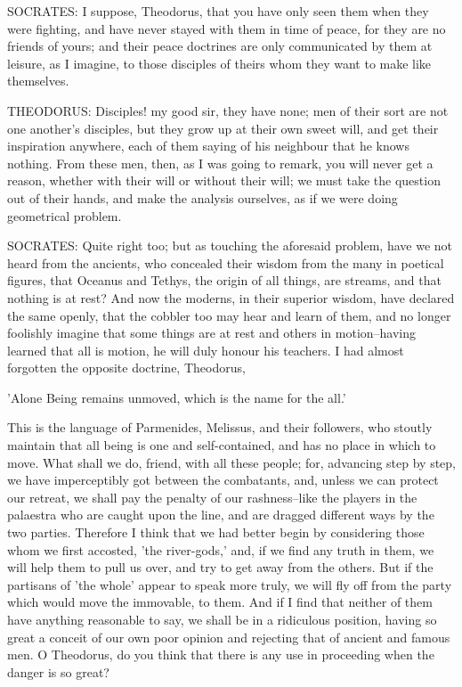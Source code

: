 SOCRATES: I suppose, Theodorus, that you have only seen them when they
were fighting, and have never stayed with them in time of peace,
for they are no friends of yours; and their peace doctrines are only
communicated by them at leisure, as I imagine, to those disciples of
theirs whom they want to make like themselves.

THEODORUS: Disciples! my good sir, they have none; men of their sort are
not one another's disciples, but they grow up at their own sweet will,
and get their inspiration anywhere, each of them saying of his neighbour
that he knows nothing. From these men, then, as I was going to remark,
you will never get a reason, whether with their will or without their
will; we must take the question out of their hands, and make the
analysis ourselves, as if we were doing geometrical problem.

SOCRATES: Quite right too; but as touching the aforesaid problem, have
we not heard from the ancients, who concealed their wisdom from the many
in poetical figures, that Oceanus and Tethys, the origin of all things,
are streams, and that nothing is at rest? And now the moderns, in their
superior wisdom, have declared the same openly, that the cobbler too may
hear and learn of them, and no longer foolishly imagine that some things
are at rest and others in motion--having learned that all is motion,
he will duly honour his teachers. I had almost forgotten the opposite
doctrine, Theodorus,

     'Alone Being remains unmoved, which is the name for the all.'

This is the language of Parmenides, Melissus, and their followers, who
stoutly maintain that all being is one and self-contained, and has no
place in which to move. What shall we do, friend, with all these people;
for, advancing step by step, we have imperceptibly got between the
combatants, and, unless we can protect our retreat, we shall pay the
penalty of our rashness--like the players in the palaestra who are
caught upon the line, and are dragged different ways by the two parties.
Therefore I think that we had better begin by considering those whom we
first accosted, 'the river-gods,' and, if we find any truth in them, we
will help them to pull us over, and try to get away from the others. But
if the partisans of 'the whole' appear to speak more truly, we will fly
off from the party which would move the immovable, to them. And if I
find that neither of them have anything reasonable to say, we shall
be in a ridiculous position, having so great a conceit of our own poor
opinion and rejecting that of ancient and famous men. O Theodorus, do
you think that there is any use in proceeding when the danger is so
great?

